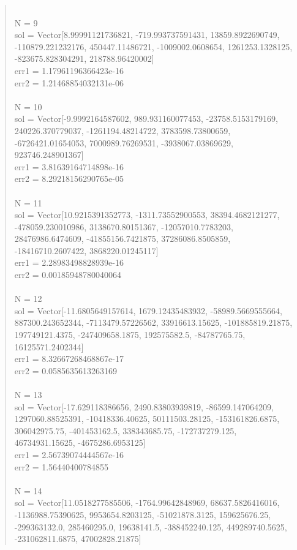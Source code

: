 \documentclass[letterpaper,12pt]{article}
\begin{document}
\begin{quote}
\\N = 9
\\sol = Vector[8.99991121736821, -719.993737591431, 13859.8922690749, -110879.221232176, 450447.11486721, -1009002.0608654, 1261253.1328125, -823675.828304291, 218788.96420002]
\\err1 = 1.17961196366423e-16
\\err2 = 1.21468854032131e-06
\\
\\N = 10
\\sol = Vector[-9.9992164587602, 989.931160077453, -23758.5153179169, 240226.370779037, -1261194.48214722, 3783598.73800659, -6726421.01654053, 7000989.76269531, -3938067.03869629, 923746.248901367]
\\err1 = 3.81639164714898e-16
\\err2 = 8.29218156290765e-05
\\
\\N = 11
\\sol = Vector[10.9215391352773, -1311.73552900553, 38394.4682121277, -478059.230010986, 3138670.80151367, -12057010.7783203, 28476986.6474609, -41855156.7421875, 37286086.8505859, -18416710.2607422, 3868220.01245117]
\\err1 = 2.28983498828939e-16
\\err2 = 0.00185948780040064
\\
\\N = 12
\\sol = Vector[-11.6805649157614, 1679.12435483932, -58989.5669555664, 887300.243652344, -7113479.57226562, 33916613.15625, -101885819.21875, 197749121.4375, -247409658.1875, 192575582.5, -84787765.75, 16125571.2402344]
\\err1 = 8.32667268468867e-17
\\err2 = 0.0585635613263169
\\
\\N = 13
\\sol = Vector[-17.629118386656, 2490.83803939819, -86599.147064209, 1297060.88525391, -10418336.40625, 50111503.28125, -153161826.6875, 306042975.75, -401453162.5, 338343685.75, -172737279.125, 46734931.15625, -4675286.6953125]
\\err1 = 2.56739074444567e-16
\\err2 = 1.56440400784855
\\
\\N = 14
\\sol = Vector[11.0518277585506, -1764.99642848969, 68637.5826416016, -1136988.75390625, 9953654.8203125, -51021878.3125, 159625676.25, -299363132.0, 285460295.0, 19638141.5, -388452240.125, 449289740.5625, -231062811.6875, 47002828.21875]

\end{quote}
\end{document}
